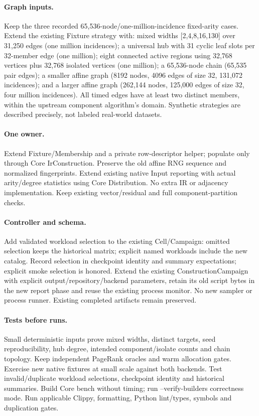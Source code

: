 \documentclass[11pt,a4paper]{article}
\begin{document}
\paragraph{Graph inputs.} Keep the three recorded 65,536-node/one-million-incidence
fixed-arity cases. Extend the existing Fixture strategy with: mixed widths
[2,4,8,16,130] over 31,250 edges (one million incidences); a universal hub with
31 cyclic leaf slots per 32-member edge (one million); eight connected active
regions using 32,768 vertices plus 32,768 isolated vertices (one million);
a 65,536-node chain (65,535 pair edges); a smaller affine graph (8192 nodes,
4096 edges of size 32, 131,072 incidences); and a larger affine graph (262,144
nodes, 125,000 edges of size 32, four million incidences). All timed edges have
at least two distinct members, within the upstream component algorithm's domain.
Synthetic strategies are described precisely, not labeled real-world datasets.
\paragraph{One owner.} Extend Fixture/Membership and a private row-descriptor
helper; populate only through Core IrConstruction. Preserve the old affine RNG
sequence and normalized fingerprints. Extend existing native Input reporting with
actual arity/degree statistics using Core Distribution. No extra IR or adjacency
implementation. Keep existing vector/residual and full component-partition checks.
\paragraph{Controller and schema.} Add validated workload selection to the existing
Cell/Campaign: omitted selection keeps the historical matrix; explicit named
workloads include the new catalog. Record selection in checkpoint identity and
summary expectations; explicit smoke selection is honored. Extend the existing
ConstructionCampaign with explicit output/repository/backend parameters, retain
its old script bytes in the new report phase and reuse the existing process monitor.
No new sampler or process runner. Existing completed artifacts remain preserved.
\paragraph{Tests before runs.} Small deterministic inputs prove mixed widths,
distinct targets, seed reproducibility, hub degree, intended component/isolate
counts and chain topology. Keep independent PageRank oracles and warm allocation
gates. Exercise new native fixtures at small scale against both backends. Test
invalid/duplicate workload selections, checkpoint identity and historical summaries.
Build Core bench without timing; run --verify-builders correctness mode.
Run applicable Clippy, formatting, Python lint/types, symbols and duplication gates.
\end{document}
